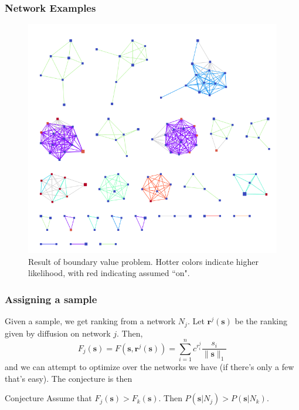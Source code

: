 \documentclass{beamer}
\renewcommand{\b}{\bm}
\begin{document}
\begin{frame}
\frametitle{Network Examples}
\begin{figure}
	\begin{center}
	\includegraphics[scale = 0.25]{ranked_bdvp.png}	
\end{center}
\caption{Result of boundary value problem. Hotter colors indicate higher likelihood, with red indicating assumed ``on".}
\end{figure}
\end{frame}
\begin{frame}
\frametitle{Assigning a sample}
 Given a sample, we get ranking from a network $N_j$. Let $\b{r}^j(\b{s})$ be the ranking given by diffusion on network $j$. Then,
\[
F_j(\b{s}) = F(\b{s},\b{r}^j(\b{s})) = \sum_{i=1}^n c^{r_i^j} \frac{s_i}{\|\b{s}\|_1}
\]
and we can attempt to optimize over the networks we have (if there's only a few that's easy). The conjecture is then
\begin{block}{Conjecture}
	Assume that $F_j(\b{s}) > F_k(\b{s})$. Then $P(\b{s}|N_j) > P(\b{s}|N_k)$.
\end{block}
\end{frame}
\end{document}
